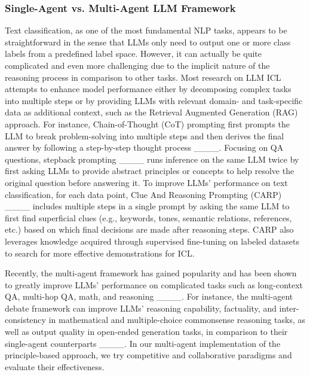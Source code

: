 \subsubsection{Single-Agent vs. Multi-Agent LLM Framework}
Text classification, as one of the most fundamental NLP tasks, appears to be straightforward in the sense that LLMs only need to output one or more class labels from a predefined label space. However, it can actually be quite complicated and even more challenging due to the implicit nature of the reasoning process in comparison to other tasks. Most research on LLM ICL attempts to enhance model performance either by decomposing complex tasks into multiple steps or by providing LLMs with relevant domain- and task-specific data as additional context, such as the Retrieval Augmented Generation (RAG) approach. For instance, Chain-of-Thought (CoT) prompting first prompts the LLM to break problem-solving into multiple steps and then derives the final answer by following a step-by-step thought process ____. Focusing on QA questions, stepback prompting ____ runs inference on the same LLM twice by first asking LLMs to provide abstract principles or concepts to help resolve the original question before answering it. To improve LLMs' performance on text classification, for each data point, Clue And Reasoning Prompting (CARP) ____ includes multiple steps in a single prompt by asking the same LLM to first find superficial clues (e.g., keywords, tones, semantic relations, references, etc.) based on which final decisions are made after reasoning steps. CARP also leverages knowledge acquired through supervised fine-tuning on labeled datasets to search for more effective demonstrations for ICL. 

Recently, the multi-agent framework has gained popularity and has been shown to greatly improve LLMs' performance on complicated tasks such as long-context QA, multi-hop QA, math, and reasoning ____. For instance, the multi-agent debate framework can improve LLMs' reasoning capability, factuality, and inter-consistency in mathematical and multiple-choice commonsense reasoning tasks, as well as output quality in open-ended generation tasks, in comparison to their single-agent counterparts ____. In our multi-agent implementation of the principle-based approach, we try competitive and collaborative paradigms and evaluate their effectiveness.

